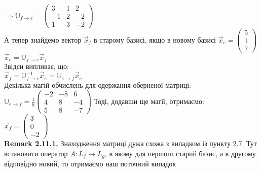 \documentclass[a4paper, 14pt]{extarticle}
\def\huge{\displaystyle}
\def\rm#1{\textbf{Remark {#1}}}
\def\bigline{\vspace{5mm}\\}
\begin{document}
$\Rightarrow \mathbb{U}_{f \to e} = \begin{pmatrix}
3 & 1 & 2 \\
-1 & 2 & -2 \\
1 & 3 & -2
\end{pmatrix}$
\bigline
А тепер знайдемо вектор $\vec{x}_f$ в старому базисі, якщо в новому базисі $\vec{x}_e = \begin{pmatrix}
 5 \\ 1 \\ 7
\end{pmatrix}$\\
$\vec{x}_e = \mathbb{U}_{f \to e}\vec{x}_f$\\
Звідси випливає, що:\\
$\vec{x}_f = \mathbb{U}^{-1}_{f \to e} \vec{x}_e = \mathbb{U}_{e \to f} \vec{x}_e$\\
Декілька магій обчислень для одержання оберненої матриці:\\
$\mathbb{U}_{e \to f} = \huge \frac{1}{8} \begin{pmatrix}
-2 & -8 & 6 \\
4 & 8 & -4 \\
5 & 8 & -7
\end{pmatrix}$
Тоді, додавши ще магії, отримаємо:\\
$\vec{x}_f = \begin{pmatrix}
3 \\ 0 \\ -2
\end{pmatrix}$
\bigline
\rm{2.11.1.} Знаходження матриці дужа схожа з випадком із пункту 2.7. Тут встановити оператор $A: L_f \to L_g$, в якому для першого старий базис, а в другому відповідно новий, то отримаємо наш поточний випадок
\bigline
\end{document}
